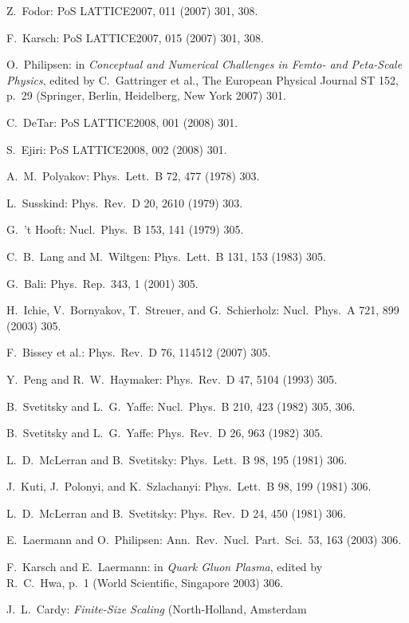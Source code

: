 \begin{enumerate}[label={[\arabic*]}]
  \item Z.~Fodor: PoS LATTICE2007, 011 (2007) 301, 308.
  \item F.~Karsch: PoS LATTICE2007, 015 (2007) 301, 308.
  \item O.~Philipsen: in \emph{Conceptual and Numerical Challenges in Femto-
        and Peta-Scale Physics}, edited by C.~Gattringer et al., The European
        Physical Journal ST 152, p.~29 (Springer, Berlin, Heidelberg, New York
        2007) 301.
  \item C.~DeTar: PoS LATTICE2008, 001 (2008) 301.
  \item S.~Ejiri: PoS LATTICE2008, 002 (2008) 301.
  \item A.~M.~Polyakov: Phys.\ Lett.\ B 72, 477 (1978) 303.
  \item L.~Susskind: Phys.\ Rev.\ D 20, 2610 (1979) 303.
  \item G.~'t Hooft: Nucl.\ Phys.\ B 153, 141 (1979) 305.
  \item C.~B.~Lang and M.~Wiltgen: Phys.\ Lett.\ B 131, 153 (1983) 305.
  \item G.~Bali: Phys.\ Rep.\ 343, 1 (2001) 305.
  \item H.~Ichie, V.~Bornyakov, T.~Streuer, and G.~Schierholz: Nucl.\ Phys.\ A
        721, 899 (2003) 305.
  \item F.~Bissey et al.: Phys.\ Rev.\ D 76, 114512 (2007) 305.
  \item Y.~Peng and R.~W.~Haymaker: Phys.\ Rev.\ D 47, 5104 (1993) 305.
  \item B.~Svetitsky and L.~G.~Yaffe: Nucl.\ Phys.\ B 210, 423 (1982)
        305, 306.
  \item B.~Svetitsky and L.~G.~Yaffe: Phys.\ Rev.\ D 26, 963 (1982) 305.
  \item L.~D.~McLerran and B.~Svetitsky: Phys.\ Lett.\ B 98, 195 (1981) 306.
  \item J.~Kuti, J.~Polonyi, and K.~Szlachanyi: Phys.\ Lett.\ B 98, 199 (1981)
        306.
  \item L.~D.~McLerran and B.~Svetitsky: Phys.\ Rev.\ D 24, 450 (1981) 306.
  \item E.~Laermann and O.~Philipsen: Ann.\ Rev.\ Nucl.\ Part.\ Sci.\ 53, 163
        (2003) 306.
  \item F.~Karsch and E.~Laermann: in \emph{Quark Gluon Plasma}, edited by\\
        R.~C.~Hwa, p.~1 (World Scientific, Singapore 2003) 306.
  \item J.~L.~Cardy: \emph{Finite-Size Scaling} (North-Holland, Amsterdam

\end{enumerate}
